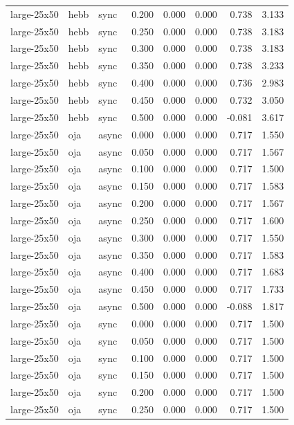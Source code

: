 \begin{tabular}{lllrrrrr}
large-25x50 & hebb & sync & 0.200 & 0.000 & 0.000 & 0.738 & 3.133 \\
large-25x50 & hebb & sync & 0.250 & 0.000 & 0.000 & 0.738 & 3.183 \\
large-25x50 & hebb & sync & 0.300 & 0.000 & 0.000 & 0.738 & 3.183 \\
large-25x50 & hebb & sync & 0.350 & 0.000 & 0.000 & 0.738 & 3.233 \\
large-25x50 & hebb & sync & 0.400 & 0.000 & 0.000 & 0.736 & 2.983 \\
large-25x50 & hebb & sync & 0.450 & 0.000 & 0.000 & 0.732 & 3.050 \\
large-25x50 & hebb & sync & 0.500 & 0.000 & 0.000 & -0.081 & 3.617 \\
large-25x50 & oja & async & 0.000 & 0.000 & 0.000 & 0.717 & 1.550 \\
large-25x50 & oja & async & 0.050 & 0.000 & 0.000 & 0.717 & 1.567 \\
large-25x50 & oja & async & 0.100 & 0.000 & 0.000 & 0.717 & 1.500 \\
large-25x50 & oja & async & 0.150 & 0.000 & 0.000 & 0.717 & 1.583 \\
large-25x50 & oja & async & 0.200 & 0.000 & 0.000 & 0.717 & 1.567 \\
large-25x50 & oja & async & 0.250 & 0.000 & 0.000 & 0.717 & 1.600 \\
large-25x50 & oja & async & 0.300 & 0.000 & 0.000 & 0.717 & 1.550 \\
large-25x50 & oja & async & 0.350 & 0.000 & 0.000 & 0.717 & 1.583 \\
large-25x50 & oja & async & 0.400 & 0.000 & 0.000 & 0.717 & 1.683 \\
large-25x50 & oja & async & 0.450 & 0.000 & 0.000 & 0.717 & 1.733 \\
large-25x50 & oja & async & 0.500 & 0.000 & 0.000 & -0.088 & 1.817 \\
large-25x50 & oja & sync & 0.000 & 0.000 & 0.000 & 0.717 & 1.500 \\
large-25x50 & oja & sync & 0.050 & 0.000 & 0.000 & 0.717 & 1.500 \\
large-25x50 & oja & sync & 0.100 & 0.000 & 0.000 & 0.717 & 1.500 \\
large-25x50 & oja & sync & 0.150 & 0.000 & 0.000 & 0.717 & 1.500 \\
large-25x50 & oja & sync & 0.200 & 0.000 & 0.000 & 0.717 & 1.500 \\
large-25x50 & oja & sync & 0.250 & 0.000 & 0.000 & 0.717 & 1.500 \\

\end{tabular}
